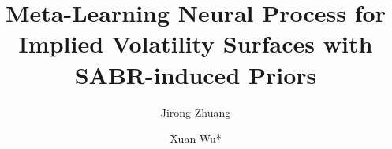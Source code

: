 \documentclass[authoryear,preprint,review,12pt]{elsarticle}
\begin{document}
\begin{frontmatter}



\title{Meta-Learning Neural Process for Implied Volatility Surfaces with SABR-induced Priors} %


\author[inst1]{Jirong Zhuang}


\author[inst1]{Xuan Wu*}




\begin{abstract}    


\end{abstract}
\end{frontmatter}
\end{document}
